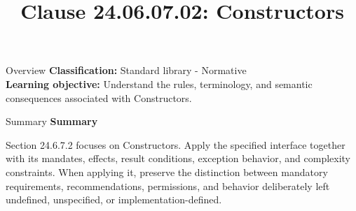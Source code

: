 \documentclass[10pt,letterpaper]{article}
\title{Clause 24.06.07.02: Constructors}
\author{}
\date{}
\begin{document}
\maketitle
\begin{CornellOverviewBox}{Overview}
\textbf{Classification:} Standard library - Normative\\[2pt]
\textbf{Learning objective:} Understand the rules, terminology, and semantic consequences associated with Constructors.
\end{CornellOverviewBox}\begin{CornellSummaryBox}{Summary}
{\sffamily\bfseries\color{Accent} Summary}\par\vspace{3pt}Section 24.6.7.2 focuses on Constructors. Apply the specified interface together with its mandates, effects, result conditions, exception behavior, and complexity constraints. When applying it, preserve the distinction between mandatory requirements, recommendations, permissions, and behavior deliberately left undefined, unspecified, or implementation-defined.
\end{CornellSummaryBox}
\end{document}
